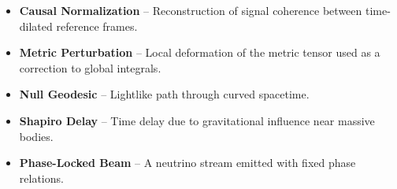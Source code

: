 \documentclass[12pt]{article}
\begin{document}
\begin{itemize}
\item \textbf{Causal Normalization} – Reconstruction of signal coherence between time-dilated reference frames.
\item \textbf{Metric Perturbation} – Local deformation of the metric tensor used as a correction to global integrals.
\item \textbf{Null Geodesic} – Lightlike path through curved spacetime.
\item \textbf{Shapiro Delay} – Time delay due to gravitational influence near massive bodies.
\item \textbf{Phase-Locked Beam} – A neutrino stream emitted with fixed phase relations.
\end{itemize}
\end{document}
